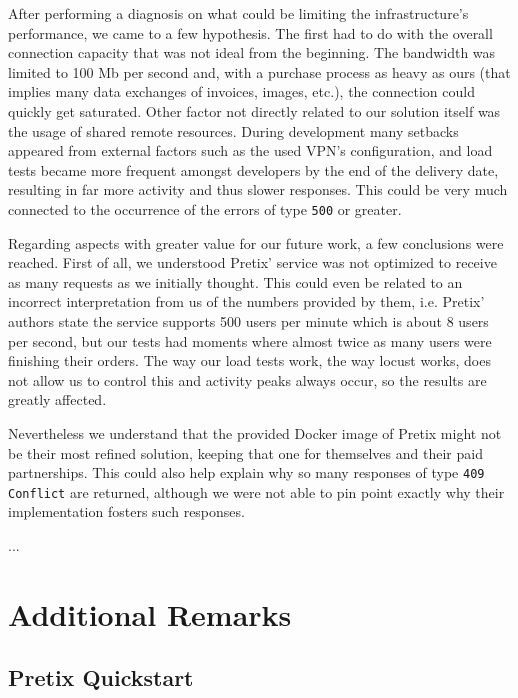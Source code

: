 \documentclass[12pt]{article}
\begin{document}
After performing a diagnosis on what could be limiting the infrastructure's performance, we came to a few hypothesis.
The first had to do with the overall connection capacity that was not ideal from the beginning. 
The bandwidth was limited to 100 Mb per second and, with a purchase process as heavy as ours (that implies many data exchanges of invoices, images, etc.), the 
connection could quickly get saturated.
Other factor not directly related to our solution itself was the usage of shared remote resources.
During development many setbacks appeared from external factors such as the used VPN's configuration, and load tests became more frequent amongst developers by 
the end of the delivery date, resulting in far more activity and thus slower responses.
This could be very much connected to the occurrence of the errors of type \texttt{500} or greater. 

Regarding aspects with greater value for our future work, a few conclusions were reached.
First of all, we understood Pretix' service was not optimized to receive as many requests as we initially thought.
This could even be related to an incorrect interpretation from us of the numbers provided by them, i.e. Pretix' authors state the service supports 500 users per 
minute which is about 8 users per second, but our tests had moments where almost twice as many users were finishing their orders.
The way our load tests work, the way locust works, does not allow us to control this and activity peaks always occur, so the results are greatly affected.

Nevertheless we understand that the provided Docker image of Pretix might not be their most refined solution, keeping that one for themselves and their paid 
partnerships.
This could also help explain why so many responses of type \texttt{409 Conflict} are returned, although we were not able to pin point exactly why their 
implementation fosters such responses. 


...

\newpage
\section{Additional Remarks} \label{remarks} %

\subsection{Pretix Quickstart} \label{remarks.quickstart} %
\end{document}
